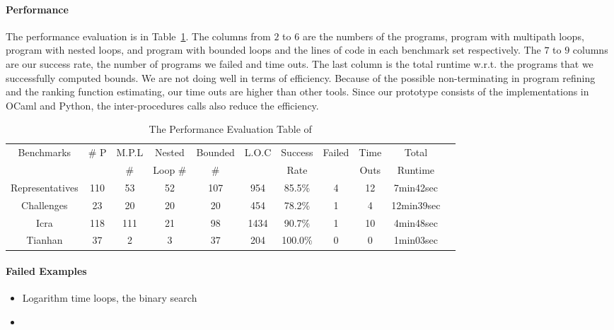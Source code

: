 \paragraph{Performance}
The performance evaluation is in Table~\ref{tb:performance-eval}.
The columns from $2$ to $6$ are the numbers of the programs, program with multipath loops, program with nested loops, and program with bounded loops and the lines of code in each benchmark set respectively.
The $7$ to $9$ columns are our success rate, the number of programs we failed and time outs. The last column is the total runtime w.r.t. the programs that we successfully computed bounds.
We are not doing well in terms of efficiency. Because of the possible non-terminating in program refining and the ranking function estimating, our time outs are higher than other tools.
Since our prototype consists of the implementations in OCaml and Python, the inter-procedures calls also reduce the efficiency.
%
%
\begin{table}[H]
\caption{The Performance Evaluation Table of {\PSRB}}
\label{tb:performance-eval}
    \centering
{\scriptsize
\begin{tabular}{ | c | c | c | c | c | c | c | c | c | c | c |}
\hline
\hline
\multirow{2}{*}{Benchmarks} & \multirow{2}{*}{\# P}  & {M.P.L} & Nested  & {Bounded} 
& \multirow{2}{*}{L.O.C} & {Success} & \multirow{2}{*}{Failed} & Time  & Total
\\
&  & \# & Loop \# & \# & & Rate &  & Outs &   Runtime \\
\hline
\hline 
{Representatives} & {110}  & 53  & 52  & 107 & 954 & 85.5\% & 4 & 12 & 7min42sec \\
\hline
Challenges & 23  & 20 & 20 & {20} & 454 & {78.2\%}  & 1 & 4 & {12min39sec} \\
\hline
{Icra} & 118 & 111 & 21 & 98 & 1434  & 90.7\% & 1 & 10 & {4min48sec} \\
\hline
Tianhan & 37 & 2 & 3 & 37 & 204 & 100.0\% & 0 & 0 & 1min03sec \\
\hline
\hline
\end{tabular}    
}
\end{table}

\paragraph{Failed Examples}

\begin{itemize}
    \item Logarithm time loops, the binary search
    \item 
\end{itemize}